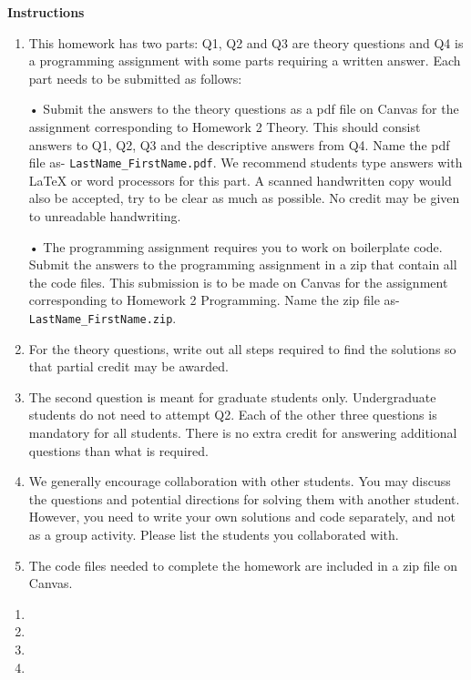 \documentclass[12pt]{article}
\begin{document}

\textbf{Instructions}
\begin{enumerate}

    \item This homework has two parts: Q1, Q2 and Q3 are theory questions and Q4 is a programming assignment with some parts requiring a written answer. Each part needs to be submitted as follows:
    
    • Submit the answers to the theory questions as a pdf file on Canvas for the assignment corresponding to Homework 2 Theory. This should consist answers to Q1, Q2, Q3 and the descriptive answers from Q4. Name the pdf file as- \texttt{LastName\_FirstName.pdf}.  We recommend students type answers with LaTeX or word processors for this part. A scanned handwritten copy would also be accepted, try to be clear as much as possible. No credit may be given to unreadable handwriting. 
    
    • The programming assignment requires you to work on boilerplate code. Submit the answers to the programming assignment in a zip that contain all the code files. This submission is to be made on Canvas for the assignment corresponding to Homework 2 Programming. Name the zip file as- \texttt{LastName\_FirstName.zip}.

    \item For the theory questions, write out all steps required to find the solutions so that partial credit may be awarded.
    \item The second question is meant for graduate students only. Undergraduate students do not need to attempt Q2. Each of the other three questions is mandatory for all students. There is no extra credit for answering additional questions than what is required.
    \item We generally encourage collaboration with other students. You may discuss the questions and potential directions for solving them with another student. However, you need to write your own solutions and code separately, and not as a group activity. Please list the students you collaborated with.
    \item The code files needed to complete the homework are included in a zip file on Canvas.
\end{enumerate}

\pagebreak

 \begin{enumerate}
   \item 
   \item 
   \item 
   \item 
 \end{enumerate}
\end{document}

